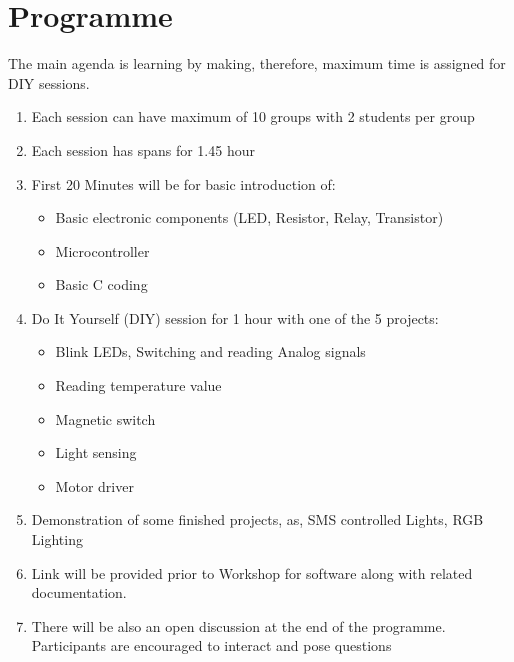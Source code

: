 \documentclass[12pt]{article} %
\begin{document}
\section{Programme} %
The main agenda is learning by making, therefore, maximum time is assigned for DIY sessions.
\begin{enumerate}
\item Each session can have maximum of 10 groups with 2 students per group
\item Each session has spans for 1.45 hour
\item First 20 Minutes will be for basic introduction of:  
	\begin{itemize}
		\item Basic electronic components (LED, Resistor, Relay, Transistor)
		\item Microcontroller
		\item Basic C coding
	\end{itemize}
\item Do It Yourself (DIY) session for 1 hour with one of the 5 projects:
	\begin{itemize}
	\item Blink LEDs, Switching and reading Analog signals
	\item Reading temperature value
	\item Magnetic switch
	\item Light sensing
	\item Motor driver
	\end{itemize}
\item Demonstration of some finished projects, as, SMS controlled Lights, RGB Lighting
\item Link will be provided prior to Workshop for software along with related documentation.
\item There will be also an open discussion at the end of the programme. Participants are encouraged to interact and pose questions
\end{enumerate}
\end{document}
